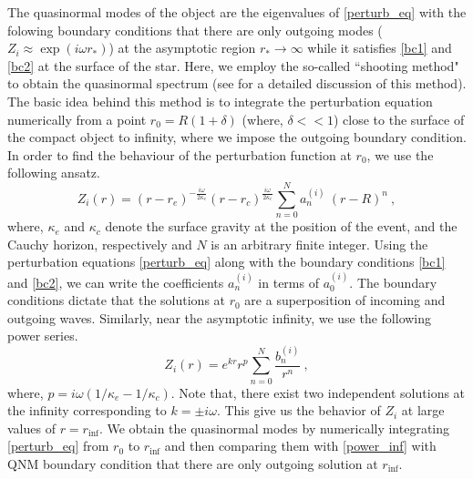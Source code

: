 \documentclass[aps,prd,twocolumn,floatfix,noshowpacs,tightenlines,noshowkeys,superscriptaddress,amsmath,amssymb,
nofootinbib]{revtex4-1}
\renewcommand\[{\begin{equation}}
\renewcommand\]{\end{equation}}
\begin{document}
 The quasinormal modes of the object are the eigenvalues of \autoref{perturb_eq} with the folowing boundary conditions that there are only outgoing modes ($Z_{i}\approx \exp(i\omega r_{*})$) at the asymptotic region $r_{*}\to \infty$ while it satisfies \autoref{bc1} and \autoref{bc2} at the surface of the star. 
 Here, we employ the so-called ``shooting method" to obtain the quasinormal spectrum (see \cite{Pani:2013pma,Konoplya:2011qq,Berti:2009kk} for a  detailed discussion of this method). The basic idea behind this method is to integrate the perturbation equation numerically from a point $r_0=R(1+\delta)$ (where, $ \delta<<1 $) close to the surface of the compact object to infinity, where we impose the outgoing boundary condition. 
 In order to find the behaviour of the perturbation function at $r_0$, we use the following ansatz.
 \begin{equation}\label{power_re}
 	Z_{i}(r)=(r-r_e)^{-\frac{i\omega}{2\kappa_{e}}}(r-r_c)^{\frac{i\omega}{2\kappa_{c}}}\sum_{n=0}^{N} a_{n}^{(i)}~(r-R)^n~,
 \end{equation}
 where, $\kappa_{e}$ and $\kappa_{c}$ denote the surface gravity at the position of the event, and the Cauchy horizon, respectively and $N$ is an arbitrary finite integer. 
 Using the perturbation equations \autoref{perturb_eq} along with the boundary conditions \autoref{bc1} and \autoref{bc2}, we can write the coefficients $a_{n}^{(i)}$ in terms of $a_{0}^{(i)}$. The boundary conditions dictate that the solutions at $r_0$ are a superposition of incoming and outgoing waves. Similarly, near the asymptotic infinity, we use the following power series.
 \begin{equation}\label{power_inf}
 	Z_{i}(r)=e^{k r} r^p\sum_{n=0}^{N} \dfrac{b_{n}^{(i)}}{r^{n}}~,
 \end{equation}
 where, $p=i\omega(1/\kappa_{e}-1/\kappa_{c})$. Note that, there exist two independent solutions at the infinity corresponding to $k=\pm i\omega$. This give us the behavior of $Z_{i}$ at large values of $r=r_{\textrm{inf}}$. We obtain the quasinormal modes by numerically integrating \autoref{perturb_eq} from $r_0$ to $r_{\textrm{inf}}$ and then comparing them with \autoref{power_inf} with QNM boundary condition that there are only outgoing solution at $r_{\textrm{inf}}$.\par
\end{document}
